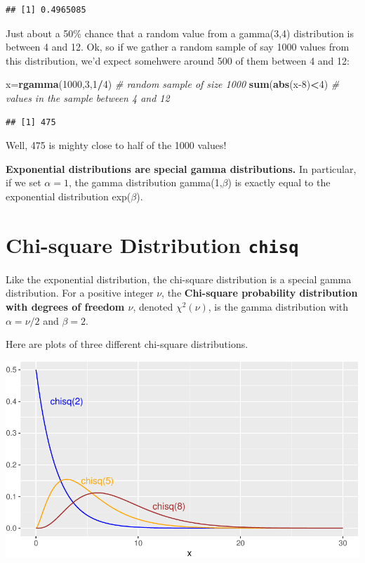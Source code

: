 \documentclass[
]{book}
\newenvironment{Shaded}{\begin{snugshade}}{\end{snugshade}}
\newcommand{\CommentTok}[1]{\textcolor[rgb]{0.56,0.35,0.01}{\textit{#1}}}
\newcommand{\DecValTok}[1]{\textcolor[rgb]{0.00,0.00,0.81}{#1}}
\newcommand{\FunctionTok}[1]{\textcolor[rgb]{0.13,0.29,0.53}{\textbf{#1}}}
\newcommand{\NormalTok}[1]{#1}
\newcommand{\OtherTok}[1]{\textcolor[rgb]{0.56,0.35,0.01}{#1}}
\newcommand{\SpecialCharTok}[1]{\textcolor[rgb]{0.81,0.36,0.00}{\textbf{#1}}}
\theoremstyle{definition}
\theoremstyle{definition}
\theoremstyle{definition}
\theoremstyle{definition}
\theoremstyle{remark}
\begin{document}
\begin{verbatim}
## [1] 0.4965085
\end{verbatim}

Just about a 50\% chance that a random value from a gamma(3,4) distribution is between 4 and 12. Ok, so if we gather a random sample of say 1000 values from this distribution, we'd expect somehwere around 500 of them between 4 and 12:

\begin{Shaded}
\begin{Highlighting}[]
\NormalTok{x}\OtherTok{=}\FunctionTok{rgamma}\NormalTok{(}\DecValTok{1000}\NormalTok{,}\DecValTok{3}\NormalTok{,}\DecValTok{1}\SpecialCharTok{/}\DecValTok{4}\NormalTok{) }\CommentTok{\# random sample of size 1000}
\FunctionTok{sum}\NormalTok{(}\FunctionTok{abs}\NormalTok{(x}\DecValTok{{-}8}\NormalTok{)}\SpecialCharTok{\textless{}}\DecValTok{4}\NormalTok{) }\CommentTok{\# values in the sample between 4 and 12}
\end{Highlighting}
\end{Shaded}

\begin{verbatim}
## [1] 475
\end{verbatim}

Well, 475 is mighty close to half of the 1000 values!

\textbf{Exponential distributions are special gamma distributions.} In particular, if we set \(\alpha=1\), the gamma distribution gamma(1,\(\beta\)) is exactly equal to the exponential distribution exp(\(\beta\)).

\section{\texorpdfstring{Chi-square Distribution \texttt{chisq}}{Chi-square Distribution chisq}}\label{chiR}

Like the exponential distribution, the chi-square distribution is a special gamma distribution. For a positive integer \(\nu\), the \textbf{Chi-square probability distribution with degrees of freedom \(\nu\)}, denoted \(\chi^2(\nu)\), is the gamma distribution with \(\alpha = \nu/2\) and \(\beta=2\).

Here are plots of three different chi-square distributions.

\begin{center}\includegraphics{math340-notes_files/figure-latex/unnamed-chunk-193-1} \end{center}
\end{document}
